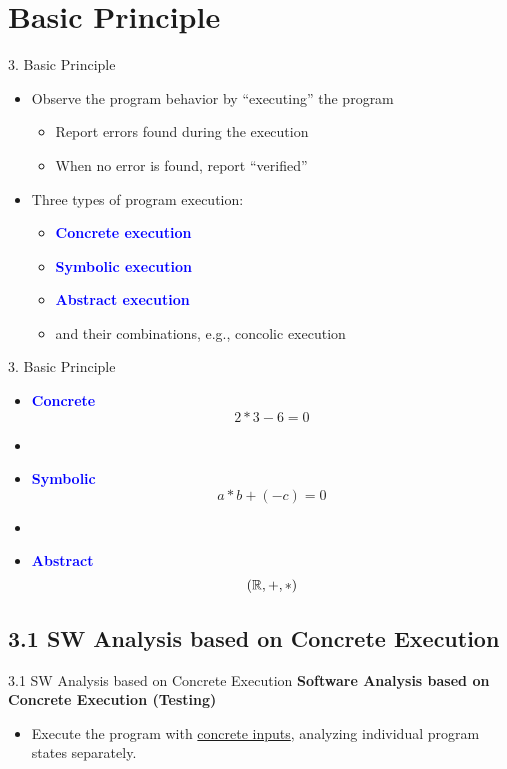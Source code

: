 \documentclass[10pt]{beamer}
\begin{document}
	\section{Basic Principle}
	\begin{frame}{3. Basic Principle}
		\begin{itemize}
			\item Observe the program behavior by ``executing'' the program
			\begin{itemize}
				\item Report errors found during the execution
				\item When no error is found, report ``verified''
			\end{itemize}
			\item Three types of program execution:
			\begin{itemize}
				\item \textcolor{blue}{\bf Concrete execution}
				\item \textcolor{blue}{\bf Symbolic execution}
				\item \textcolor{blue}{\bf Abstract execution}
				\item and their combinations, e.g., concolic execution 
			\end{itemize}
		\end{itemize}
	\end{frame}
	\begin{frame}{3. Basic Principle}
		\begin{itemize}
			\item \textcolor{blue}{\bf Concrete} \[
			2 * 3 - 6 = 0
			\]
			\item []
			\item \textcolor{blue}{\bf Symbolic} \[
			a*b+(-c)=0
			\]
			\item []
			\item \textcolor{blue}{\bf Abstract} \[
			(\mathbb{R}, +, *)
			\]
		\end{itemize}
	\end{frame}

	\subsection{3.1 SW Analysis based on Concrete Execution}
	\begin{frame}{3.1 SW Analysis based on Concrete Execution}
		\textbf{Software Analysis based on Concrete Execution (Testing)}
		\begin{itemize}
			\item Execute the program with \underline{concrete inputs}, analyzing individual program states separately.
		\end{itemize}
	\end{frame}
\end{document}
